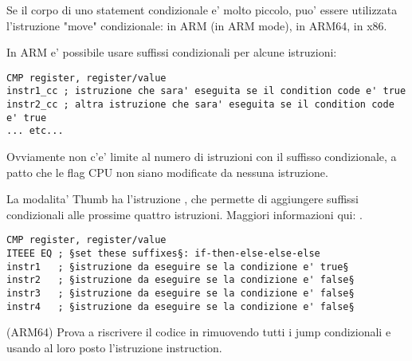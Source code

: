 
Se il corpo di uno statement condizionale e' molto piccolo, puo' essere utilizzata l'istruzione "move" condizionale: 
 in ARM (in ARM mode),  in ARM64,  in x86.


In ARM e' possibile usare suffissi condizionali per alcune istruzioni:

\begin{lstlisting}[caption=ARM (\ARMMode)]
CMP register, register/value
instr1_cc ; istruzione che sara' eseguita se il condition code e' true
instr2_cc ; altra istruzione che sara' eseguita se il condition code e' true
... etc...
\end{lstlisting}

Ovviamente non c'e' limite al numero di istruzioni con il suffisso condizionale, a patto che le flag CPU non siano modificate da nessuna istruzione. 


La modalita' Thumb ha l'istruzione , che permette di aggiungere suffissi condizionali alle prossime quattro istruzioni.
Maggiori informazioni qui: .

\begin{lstlisting}[caption=ARM (\ThumbMode)]
CMP register, register/value
ITEEE EQ ; §set these suffixes§: if-then-else-else-else
instr1   ; §istruzione da eseguire se la condizione e' true§
instr2   ; §istruzione da eseguire se la condizione e' false§
instr3   ; §istruzione da eseguire se la condizione e' false§
instr4   ; §istruzione da eseguire se la condizione e' false§
\end{lstlisting}

\sectionold{\Esercizio}

(ARM64) Prova a riscrivere il codice in  rimuovendo tutti i jump condizionali e usando al loro posto l'istruzione  instruction.

